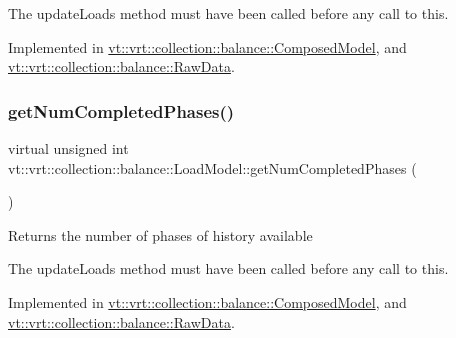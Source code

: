The {\ttfamily update\+Loads} method must have been called before any call to this. 

Implemented in \hyperlink{classvt_1_1vrt_1_1collection_1_1balance_1_1_composed_model_a23ca95221c6bffb7417aafa2c939b40a}{vt\+::vrt\+::collection\+::balance\+::\+Composed\+Model}, and \hyperlink{structvt_1_1vrt_1_1collection_1_1balance_1_1_raw_data_a07ae6234d91c2daa7c2d51117b224f7d}{vt\+::vrt\+::collection\+::balance\+::\+Raw\+Data}.

\mbox{\label{classvt_1_1vrt_1_1collection_1_1balance_1_1_load_model_a999b155237ce8ba253019e783462a9aa}} 
\subsubsection{\texorpdfstring{get\+Num\+Completed\+Phases()}{getNumCompletedPhases()}}
{\footnotesize\ttfamily virtual unsigned int vt\+::vrt\+::collection\+::balance\+::\+Load\+Model\+::get\+Num\+Completed\+Phases (\begin{DoxyParamCaption}{ }\end{DoxyParamCaption})\hspace{0.3cm}{\ttfamily [pure virtual]}}

Returns the number of phases of history available

The {\ttfamily update\+Loads} method must have been called before any call to this. 

Implemented in \hyperlink{classvt_1_1vrt_1_1collection_1_1balance_1_1_composed_model_a2797ee7c1b39b815fe63279a7d67ed90}{vt\+::vrt\+::collection\+::balance\+::\+Composed\+Model}, and \hyperlink{structvt_1_1vrt_1_1collection_1_1balance_1_1_raw_data_a151f3230094feacd15015f51980b8e9e}{vt\+::vrt\+::collection\+::balance\+::\+Raw\+Data}.

\mbox{\label{classvt_1_1vrt_1_1collection_1_1balance_1_1_load_model_a87b90c2daf3a34243a7a2af266aa0b29}} 
